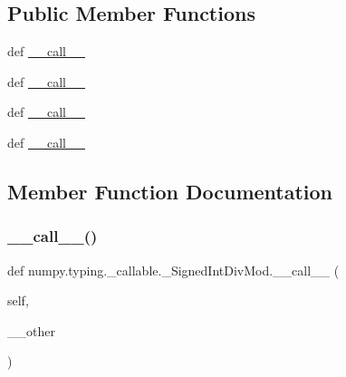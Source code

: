 \subsection*{Public Member Functions}
\begin{DoxyCompactItemize}
\item 
def \hyperlink{classnumpy_1_1typing_1_1__callable_1_1__SignedIntDivMod_afe8d6d50113b45465189188b9f65aed9}{\+\_\+\+\_\+call\+\_\+\+\_\+}
\item 
def \hyperlink{classnumpy_1_1typing_1_1__callable_1_1__SignedIntDivMod_afe8d6d50113b45465189188b9f65aed9}{\+\_\+\+\_\+call\+\_\+\+\_\+}
\item 
def \hyperlink{classnumpy_1_1typing_1_1__callable_1_1__SignedIntDivMod_afe8d6d50113b45465189188b9f65aed9}{\+\_\+\+\_\+call\+\_\+\+\_\+}
\item 
def \hyperlink{classnumpy_1_1typing_1_1__callable_1_1__SignedIntDivMod_afe8d6d50113b45465189188b9f65aed9}{\+\_\+\+\_\+call\+\_\+\+\_\+}
\end{DoxyCompactItemize}


\subsection{Member Function Documentation}
\mbox{\label{classnumpy_1_1typing_1_1__callable_1_1__SignedIntDivMod_afe8d6d50113b45465189188b9f65aed9}} 
\subsubsection{\texorpdfstring{\+\_\+\+\_\+call\+\_\+\+\_\+()}{\_\_call\_\_()}\hspace{0.1cm}{\footnotesize\ttfamily [1/4]}}
{\footnotesize\ttfamily def numpy.\+typing.\+\_\+callable.\+\_\+\+Signed\+Int\+Div\+Mod.\+\_\+\+\_\+call\+\_\+\+\_\+ (\begin{DoxyParamCaption}\item[{}]{self,  }\item[{}]{\+\_\+\+\_\+other }\end{DoxyParamCaption})}


